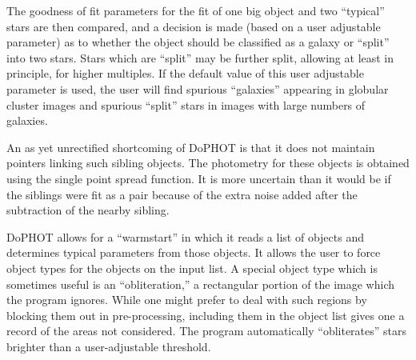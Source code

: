 The goodness of fit parameters for the fit of one big object
and two ``typical'' stars are then compared, and a decision
is made (based on a user adjustable parameter) as to whether
the object should be classified as a galaxy or ``split''
into two stars.  Stars which are ``split'' may be further
split, allowing at least in principle, for higher multiples.
If the default value of this user adjustable parameter is
used, the user will find spurious ``galaxies'' appearing
in globular cluster images and spurious ``split'' stars in
images with large numbers of galaxies.

An as yet unrectified shortcoming of DoPHOT is that it does
not maintain pointers linking such sibling objects.  The
photometry for these objects is obtained using the single
point spread function. It is more uncertain than it would be
if the siblings were fit as a pair because of the extra
noise added after the subtraction of the nearby sibling.

DoPHOT allows for a ``warmstart'' in which it reads a list
of objects and determines typical parameters from those
objects.  It allows the user to force object types for the
objects on the input list.  A special object type which is
sometimes useful is an ``obliteration,'' a rectangular
portion of the image which the program ignores.  While one
might prefer to deal with such regions by blocking them out
in pre-processing, including them in the object list gives
one a record of the areas not considered.  The program
automatically ``obliterates'' stars brighter than a
user-adjustable threshold.

























